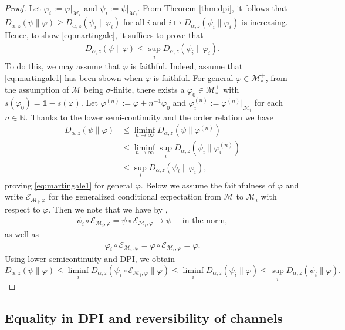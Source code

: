 \documentclass[12pt]{article}
\theoremstyle{definition}
\theoremstyle{remark}
\numberwithin{equation}{section}
\def\cE{\mathcal E}
\def\cM{\mathcal M}
\def\ffi{\varphi}
\def\1{\mathbf{1}}
\def\bN{\mathbb{N}}
\begin{document}
\begin{proof}
Let $\ffi_i:=\ffi|_{\cM_i}$ and $\psi_i:=\psi|_{\cM_i}$. From Theorem
\ref{thm:dpi}, it
follows that $D_{\alpha,z}(\psi\|\ffi)\ge D_{\alpha,z}(\psi_i\|\ffi_i)$ for all $i$ and
$i\mapsto D_{\alpha,z}(\psi_i\|\ffi_i)$ is increasing. Hence, to show \eqref{eq:martingale}, it suffices to prove that
\begin{align}\label{eq:martingale1}
D_{\alpha,z}(\psi\|\ffi)\le\sup_iD_{\alpha,z}(\psi_i\|\ffi_i).
\end{align}
To do this, we may assume that $\ffi$ is faithful. Indeed, assume that
\eqref{eq:martingale1} has been sbown when $\ffi$ is
faithful. For general $\ffi\in\cM_*^+$, from the assumption of $\cM$ being $\sigma$-finite, there exists a
$\ffi_0\in\cM_*^+$ with $s(\ffi_0)=\1-s(\ffi)$. Let $\ffi^{(n)}:=\ffi+n^{-1}\ffi_0$ and $\ffi_i^{(n)}:=\ffi^{(n)}|_{\cM_i}$
for each $n\in\bN$. Thanks to the lower semi-continuity \cite[Theorem 1(iv) and Theorem
2(iv)]{kato2023onrenyi} and the order
relation \cite[Theorem 1(iii) and Theorem 2(iii)]{kato2023onrenyi} we have
\begin{align*}
D_{\alpha,z}(\psi\|\ffi)&\le\liminf_{n\to\infty}D_{\alpha,z}(\psi\|\ffi^{(n)}) \\
&\le\liminf_{n\to\infty}\sup_iD_{\alpha,z}(\psi_i\|\ffi_i^{(n)}) \\
&\le\sup_iD_{\alpha,z}(\psi_i\|\ffi_i),
\end{align*}
proving \eqref{eq:martingale1} for general $\ffi$. Below we assume the faithfulness of $\ffi$ and write $\cE_{\cM_i,\ffi}$
for the generalized conditional expectation from $\cM$ to $\cM_i$ with respect to $\ffi$. 
Then we note that we have by \cite[Theorem 3]{HT},  
\begin{align}\label{eq:martingaleHT}
\psi_i\circ\cE_{\cM_i,\ffi}=\psi\circ\cE_{\cM_i,\ffi}\to\psi\quad\mbox{ in the norm},
\end{align}
as well as
\begin{align}\label{eq:condexp}
\ffi_i\circ\cE_{\cM_i,\ffi}=\ffi\circ\cE_{\cM_i,\ffi}=\ffi.
\end{align}
Using lower semicontinuity and DPI, we obtain
\[
D_{\alpha,z}(\psi\|\ffi)\le \liminf_{i}
D_{\alpha,z}(\psi_i\circ\cE_{\cM_i,\varphi}\|\ffi)\le \liminf_i
D_{\alpha,z}(\psi_i\|\varphi)\le \sup_i D_{\alpha,z}(\psi_i\|\ffi).
\]
\end{proof}


\subsection{Equality in DPI and reversibility of channels}
\end{document}
